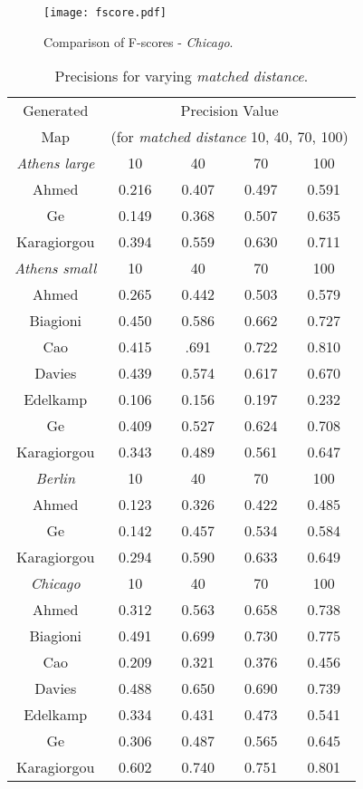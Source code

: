 \documentclass[natbib]{svjour3}                    \smartqed  \usepackage[table]{xcolor}
\begin{document}
\begin{figure}[htbp]
\begin{center}	
\texttt{[image: fscore.pdf]}
\end{center}
\vspace{-2pt} 
 \caption{Comparison of F-scores - \emph{Chicago}.}
 \label{fig:biagioniMeasure}
\vspace{-2pt}
\end{figure}



\begin{table}[htbp]\scriptsize
\centering
\begin{tabular}{|c||c c c c|}
\hline
Generated& \multicolumn{4}{c|}{Precision Value}\\
Map&  \multicolumn{4}{c|}{(for {\em matched distance} 10, 40, 70, 100)}\\
\hline
\hline
\multicolumn{1}{|c||}{\emph{Athens large}}&10&40&70&100\\
\hline
Ahmed&0.216&0.407&0.497&0.591\\
Ge&0.149&0.368&0.507&0.635\\
Karagiorgou&0.394&0.559&0.630&0.711\\
\hline
\multicolumn{1}{|c||}{\emph{Athens small}}&10&40&70&100\\
\hline
Ahmed&0.265&0.442&0.503&0.579\\
Biagioni&0.450&0.586&0.662&0.727\\
Cao&0.415&.691&0.722&0.810\\
Davies&0.439&0.574&0.617&0.670\\
Edelkamp&0.106&0.156&0.197&0.232\\
Ge&0.409&0.527&0.624&0.708\\
Karagiorgou&0.343&0.489&0.561&0.647\\
\hline
\multicolumn{1}{|c||}{\emph{Berlin}}&10&40&70&100\\
\hline
Ahmed&0.123&0.326&0.422&0.485\\
Ge&0.142&0.457&0.534&0.584\\
Karagiorgou&0.294&0.590&0.633&0.649\\
\hline
\multicolumn{1}{|c||}{\emph{Chicago}}&10&40&70&100\\
\hline
Ahmed&0.312&0.563&0.658&0.738\\
\cellcolor{gray!40}Biagioni&0.491&0.699&0.730&0.775\\
\cellcolor{gray!25}Cao&0.209&0.321&0.376&0.456\\
\cellcolor{gray!40}Davies&0.488&0.650&0.690&0.739\\
Edelkamp&0.334&0.431&0.473&0.541\\
Ge&0.306&0.487&0.565&0.645\\
\cellcolor{gray!40}Karagiorgou&0.602&0.740&0.751&0.801\\
\hline
\end{tabular}
\caption{Precisions for varying {\em matched distance}.}
\label{tab:biagioniSummary}
\end{table}
\end{document}
